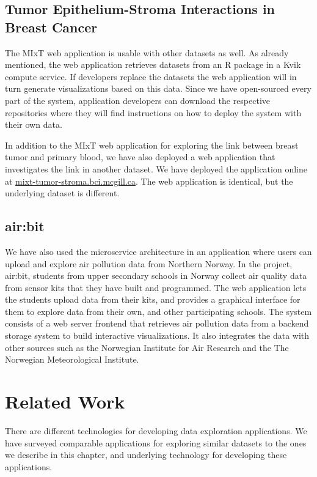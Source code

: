 \subsection{Tumor Epithelium-Stroma Interactions in Breast Cancer}
The MIxT web application is usable with other datasets as well. As already
mentioned, the web application retrieves datasets from an R package in a Kvik
compute service. If developers replace the datasets the web application will in
turn generate visualizations based on this data. Since we have open-sourced
every part of the system, application developers can download the respective
repositories where they will find instructions on how to deploy the system with
their own data. 

In addition to the MIxT web application for exploring the link between breast
tumor and primary blood, we have also deployed a web application that
investigates the link in another dataset.\cite{boersma2008stromal} We have
deployed the application online at \url{mixt-tumor-stroma.bci.mcgill.ca}. The
web application is identical, but the underlying dataset is different.

\subsection{air:bit}
We have also used the microservice architecture in an application where users
can upload and explore air pollution data from Northern
Norway.\cite{fjukstad2018low} In the project, air:bit, students from upper
secondary schools in Norway collect air quality data from sensor kits that they
have built and programmed. The web application lets the students upload data
from their kits, and provides a graphical interface for them to explore data
from their own, and other participating schools. The system consists of a web
server frontend that retrieves air pollution data from a backend storage system
to build interactive visualizations. It also integrates the data with other
sources such as the Norwegian Institute for Air Research and the The Norwegian
Meteorological Institute. 

\section{Related Work}\label{sec:int:rel}
There are different technologies for developing data exploration applications.
We have surveyed comparable applications for exploring similar datasets to the
ones we describe in this chapter, and underlying technology for developing these
applications. 

